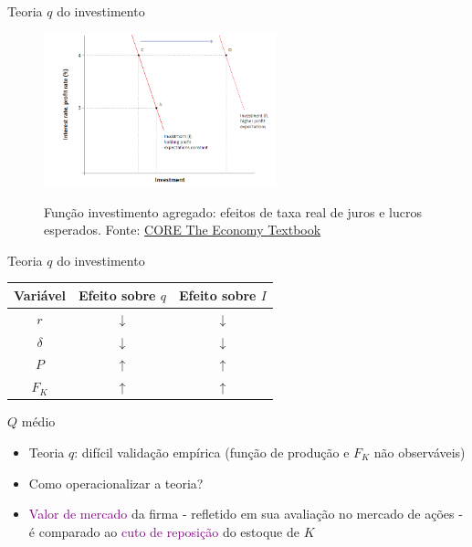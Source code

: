 \documentclass[10pt]{beamer}
\begin{document}
\begin{frame}
    {Teoria $q$ do investimento}
    \begin{figure}
        \centering
        \href{https://core-econ.org/the-economy/book/text/14.html\#144-investment-spending}{\includegraphics[width=0.6\textwidth]{./figures/aula8_fig11.PNG}}
        \caption{Função investimento agregado: efeitos de taxa real de juros e lucros esperados. Fonte: \href{https://core-econ.org/the-economy/book/text/14.html\#144-investment-spending}{CORE The Economy Textbook}}
    \end{figure}
\end{frame}

\begin{frame}
    {Teoria $q$ do investimento}
    \begin{center}
        \begin{tabular}{ |c|c|c| } 
         \hline
         Variável & Efeito sobre $q$ & Efeito sobre $I$ \\ 
         \hline
         \hline
         $r$ & $\downarrow$ & $\downarrow$ \\
         $\delta$ & $\downarrow$ & $\downarrow$ \\
         $P$ & $\uparrow$ & $\uparrow$ \\
         $F_K$ & $\uparrow$ & $\uparrow$ \\
         \hline
        \end{tabular}        
        \end{center}    
\end{frame}

\begin{frame}
    {$Q$ médio}
    \begin{itemize}
        \item Teoria $q$: difícil validação empírica (função de produção e $F_K$ não observáveis)\bigskip
        \item Como operacionalizar a teoria?\bigskip
        \item \textcolor{purple}{Valor de mercado} da firma - refletido em sua avaliação no mercado de ações - é comparado ao \textcolor{purple}{cuto de reposição} do estoque de $K$\bigskip        
    \end{itemize}
\end{frame}
\end{document}
